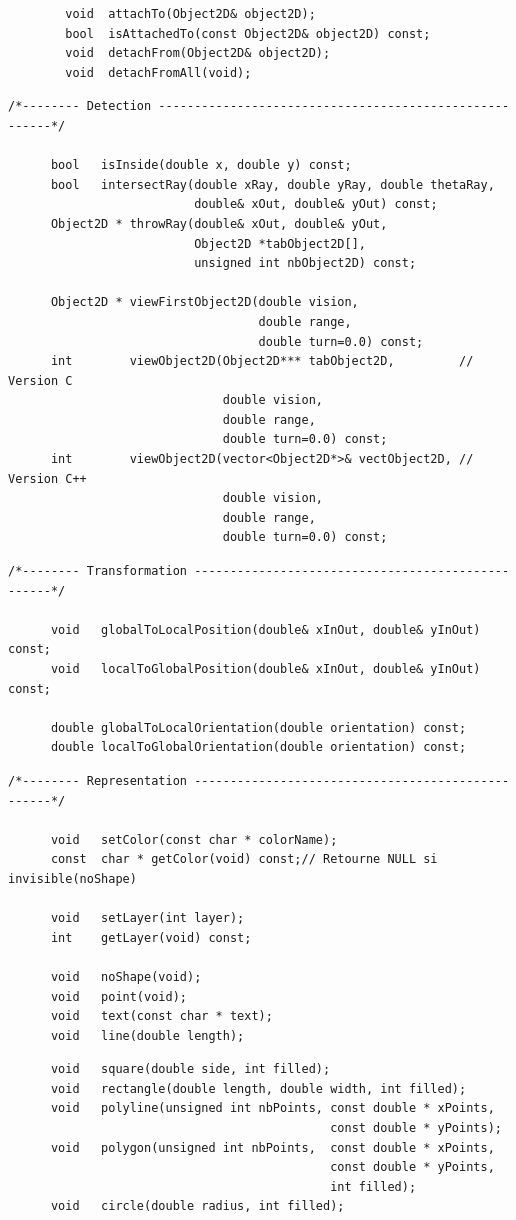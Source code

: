 \documentclass[12pt]{article}
\begin{document}
\begin{small}
\begin{verbatim}
        void  attachTo(Object2D& object2D);
        bool  isAttachedTo(const Object2D& object2D) const;
        void  detachFrom(Object2D& object2D);
        void  detachFromAll(void);
\end{verbatim}
\begin{verbatim}
/*-------- Detection -------------------------------------------------------*/

      bool   isInside(double x, double y) const;
      bool   intersectRay(double xRay, double yRay, double thetaRay,
                          double& xOut, double& yOut) const;
      Object2D * throwRay(double& xOut, double& yOut,
                          Object2D *tabObject2D[],
                          unsigned int nbObject2D) const;

      Object2D * viewFirstObject2D(double vision,
                                   double range,
                                   double turn=0.0) const;
      int        viewObject2D(Object2D*** tabObject2D,         // Version C
                              double vision,
                              double range,
                              double turn=0.0) const;
      int        viewObject2D(vector<Object2D*>& vectObject2D, // Version C++
                              double vision,
                              double range,
                              double turn=0.0) const;
\end{verbatim}
\begin{verbatim}
/*-------- Transformation --------------------------------------------------*/

      void   globalToLocalPosition(double& xInOut, double& yInOut) const;
      void   localToGlobalPosition(double& xInOut, double& yInOut) const;

      double globalToLocalOrientation(double orientation) const;
      double localToGlobalOrientation(double orientation) const;
\end{verbatim}
\begin{verbatim}
/*-------- Representation --------------------------------------------------*/

      void   setColor(const char * colorName);
      const  char * getColor(void) const;// Retourne NULL si invisible(noShape)

      void   setLayer(int layer);
      int    getLayer(void) const;

      void   noShape(void);
      void   point(void);
      void   text(const char * text);
      void   line(double length);
\end{verbatim}
\newpage
\begin{verbatim}
      void   square(double side, int filled);
      void   rectangle(double length, double width, int filled);
      void   polyline(unsigned int nbPoints, const double * xPoints,
                                             const double * yPoints);
      void   polygon(unsigned int nbPoints,  const double * xPoints,
                                             const double * yPoints,
                                             int filled);
      void   circle(double radius, int filled);


\end{verbatim}
\end{small}
\end{document}
